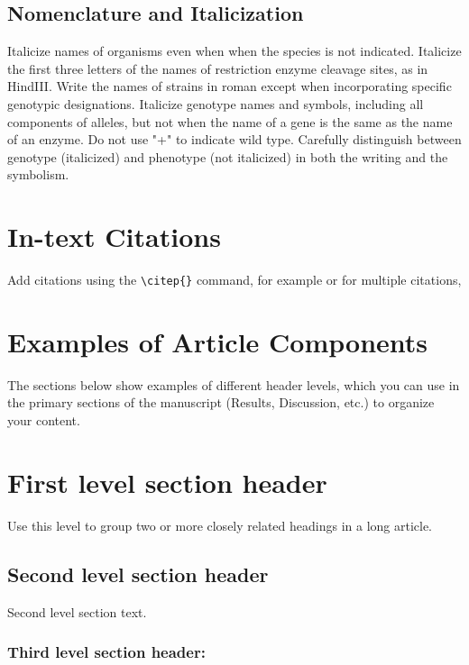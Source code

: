 \documentclass[9pt,twocolumn,twoside]{gsajnl}
\begin{document}
\subsection*{Nomenclature and Italicization} Italicize names of organisms even when  when the species is not indicated.  Italicize the first three letters of the names of restriction enzyme cleavage sites, as in HindIII. Write the names of strains in roman except when incorporating specific genotypic designations. Italicize genotype names and symbols, including all components of alleles, but not when the name of a gene is the same as the name of an enzyme. Do not use "+" to indicate wild type. Carefully distinguish between genotype (italicized) and phenotype (not italicized) in both the writing and the symbolism.

\section*{In-text Citations}

Add citations using the \verb|\citep{}| command, for example \citep{neher2013genealogies} or for multiple citations, \citep{neher2013genealogies, rodelsperger2014characterization}

\section*{Examples of Article Components}
\label{sec:examples}

The sections below show examples of different header levels, which you can use in the primary sections of the manuscript (Results, Discussion, etc.) to organize your content.

\section*{First level section header}

Use this level to group two or more closely related headings in a long article.

\subsection*{Second level section header}

Second level section text.

\subsubsection*{Third level section header:}
\end{document}
